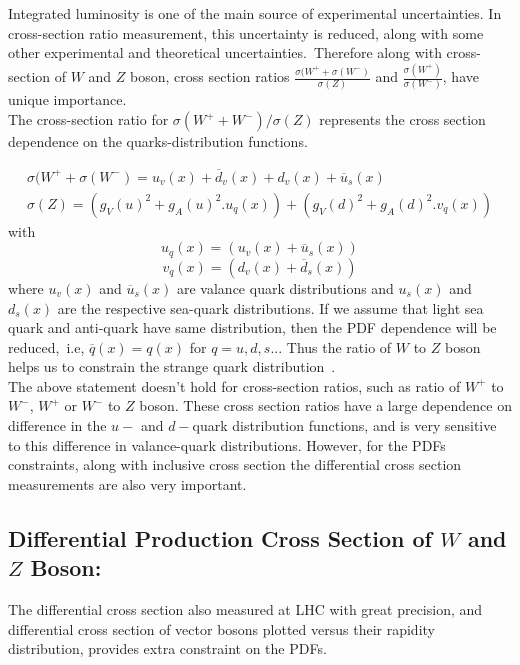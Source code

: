 Integrated luminosity is one of the main source of experimental uncertainties. In cross-section ratio measurement, this uncertainty is reduced, along with some other experimental and theoretical uncertainties.~Therefore along with cross-section of $W$ and $Z$ boson, cross section ratios $\frac{\sigma(W^{+}+\sigma(W^{-})}{\sigma(Z)}$ and $\frac{\sigma(W^{+})}{\sigma(W^{-})}$, have unique importance.\\
The cross-section ratio for $\sigma(W^{+}+W^{-})/\sigma(Z)$ represents the cross section dependence on the quarks-distribution functions.
 
 \begin{eqnarray}
\sigma(W^{+}+\sigma(W^{-})=u_{v}(x)+\overline{d}_{v}(x)+d_{v}(x)+\overline{u}_{s}(x)\\
\sigma(Z)=(g_{V}(u)^{2}+g_{A}(u)^{2}.u_{q}(x))+(g_{V}(d)^{2}+g_{A}(d)^{2}.v_{q}(x))
\end{eqnarray} 
with\\

\begin{equation}
u_{q}(x)=(u_{v}(x)+\overline{u}_{s}(x))
\end{equation}
\begin{equation}
v_{q}(x)=(d_{v}(x)+\overline{d}_{s}(x))  
\end{equation}
where $u_{v}(x)$ and $\overline{u}_{s}(x)$ are valance quark distributions and $u_{s}(x)$ and $d_{s}(x)$ are the respective sea-quark distributions.
If we assume that light sea quark and anti-quark have same distribution, then the PDF dependence will be reduced,~i.e, $\overline{q}(x) = q(x)$  for $q= u,d,s..$. Thus the ratio of $W$ to $Z$ boson helps us to constrain the strange quark distribution~\cite{Aad_2012}.\\
The above statement doesn't hold for cross-section ratios, such as ratio of $W^{+}$ to $W^{-}$, $W^{+}$ or $W^{-}$ to $Z$ boson. These cross section ratios have a large dependence on difference in the $u-$ and $d-$quark distribution functions, and is very sensitive to this difference in valance-quark distributions. However, for the PDFs constraints, along with inclusive cross section the differential cross section measurements are also very important. 

\subsection{Differential Production Cross Section of $W$ and $Z$ Boson:}
The differential cross section also measured at LHC with great precision, and differential cross section of vector bosons plotted versus their rapidity distribution, provides extra constraint on the PDFs.

